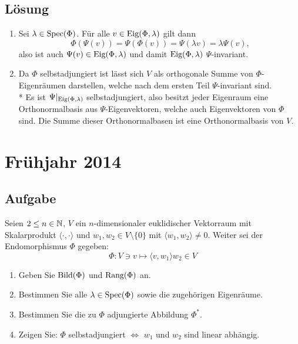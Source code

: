 \subsection{Lösung}
\begin{enumerate}
	\item Sei \( \lambda \in \text{Spec}(\Phi) \). Für alle \( v \in \text{Eig}(\Phi,\lambda) \) gilt dann
	\begin{equation*}
	 	\Phi(\Psi(v)) = \Psi(\Phi(v)) = \Psi(\lambda v) = \lambda \Psi(v)\text{,}
	 \end{equation*} 
	 also ist auch \( \Psi(v) \in \text{Eig}(\Phi,\lambda) \) und damit \( \text{Eig}(\Phi,\lambda) \) \( \Psi \)-invariant.

	 \item Da \( \Phi \) selbstadjungiert ist lässt sich \( V \) als orthogonale Summe von \( \Phi \)-Eigenräumen darstellen, welche nach dem ersten Teil \( \Psi \)-invariant sind. \\*
	 	Es ist \( \Psi|_{\text{Eig}(\Phi, \lambda) } \) selbstadjungiert, also besitzt jeder Eigenraum eine Orthonormalbasis aus \( \Psi \)-Eigenvektoren, welche auch Eigenvektoren von \( \Phi \) sind. Die Summe dieser Orthonormalbasen ist eine Orthonormalbasis von \( V \).
\end{enumerate}

\newpage

\section{Frühjahr 2014}

\subsection{Aufgabe}
Seien \( 2 \leq n \in \mathbb{N} \), \( V \) ein \( n \)-dimensionaler euklidischer Vektorraum mit Skalarprodukt \( \langle \cdot, \cdot \rangle \) und \( w_1, w_2 \in V \setminus \{ 0 \} \) mit \( \langle w_1,w_2 \rangle \neq 0 \). Weiter sei der Endomorphismus \( \Phi \) gegeben:
\begin{equation*}
	\Phi: V \ni v \mapsto \langle v,w_1 \rangle w_2 \in V
\end{equation*}
\begin{enumerate}
	\item Geben Sie \( \text{Bild}(\Phi) \) und \( \text{Rang}(\Phi) \) an.
	\item Bestimmen Sie alle \( \lambda \in \text{Spec}(\Phi) \) sowie die zugehörigen Eigenräume.
	\item Bestimmen Sie die zu \( \Phi \) adjungierte Abbildung \( \Phi^\ast \).
	\item Zeigen Sie: \( \Phi \) selbstadjungiert \( \Leftrightarrow \) \( w_1 \) und \( w_2 \) sind linear abhängig.
\end{enumerate}

